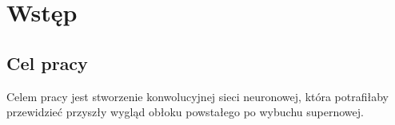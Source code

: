 
\chapter{Wstęp}


\section{Cel pracy}


Celem pracy jest stworzenie konwolucyjnej sieci neuronowej, która potrafiłaby przewidzieć przyszły wygląd obłoku powstałego po wybuchu supernowej.


\medskip


